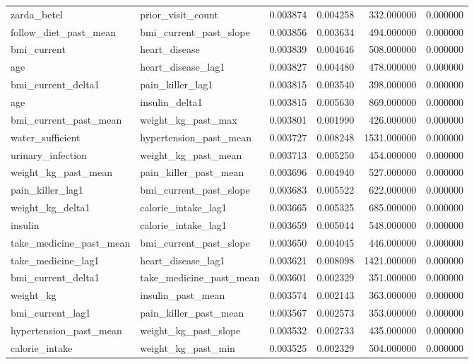 \begin{longtable}{llrrrr}
zarda\_betel & prior\_visit\_count & 0.003874 & 0.004258 & 332.000000 & 0.000000 \\
follow\_diet\_past\_mean & bmi\_current\_past\_slope & 0.003856 & 0.003634 & 494.000000 & 0.000000 \\
bmi\_current & heart\_disease & 0.003839 & 0.004646 & 508.000000 & 0.000000 \\
age & heart\_disease\_lag1 & 0.003827 & 0.004480 & 478.000000 & 0.000000 \\
bmi\_current\_delta1 & pain\_killer\_lag1 & 0.003815 & 0.003540 & 398.000000 & 0.000000 \\
age & insulin\_delta1 & 0.003815 & 0.005630 & 869.000000 & 0.000000 \\
bmi\_current\_past\_mean & weight\_kg\_past\_max & 0.003801 & 0.001990 & 426.000000 & 0.000000 \\
water\_sufficient & hypertension\_past\_mean & 0.003727 & 0.008248 & 1531.000000 & 0.000000 \\
urinary\_infection & weight\_kg\_past\_mean & 0.003713 & 0.005250 & 454.000000 & 0.000000 \\
weight\_kg\_past\_mean & pain\_killer\_past\_mean & 0.003696 & 0.004940 & 527.000000 & 0.000000 \\
pain\_killer\_lag1 & bmi\_current\_past\_slope & 0.003683 & 0.005522 & 622.000000 & 0.000000 \\
weight\_kg\_delta1 & calorie\_intake\_lag1 & 0.003665 & 0.005325 & 685.000000 & 0.000000 \\
insulin & calorie\_intake\_lag1 & 0.003659 & 0.005044 & 548.000000 & 0.000000 \\
take\_medicine\_past\_mean & bmi\_current\_past\_slope & 0.003650 & 0.004045 & 446.000000 & 0.000000 \\
take\_medicine\_lag1 & heart\_disease\_lag1 & 0.003621 & 0.008098 & 1421.000000 & 0.000000 \\
bmi\_current\_delta1 & take\_medicine\_past\_mean & 0.003601 & 0.002329 & 351.000000 & 0.000000 \\
weight\_kg & insulin\_past\_mean & 0.003574 & 0.002143 & 363.000000 & 0.000000 \\
bmi\_current\_lag1 & pain\_killer\_past\_mean & 0.003567 & 0.002573 & 353.000000 & 0.000000 \\
hypertension\_past\_mean & weight\_kg\_past\_slope & 0.003532 & 0.002733 & 435.000000 & 0.000000 \\
calorie\_intake & weight\_kg\_past\_min & 0.003525 & 0.002329 & 504.000000 & 0.000000 \\

\end{longtable}
